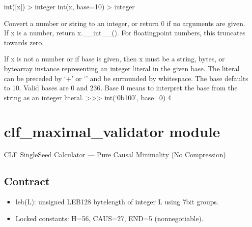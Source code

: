 \documentclass[letterpaper,10pt,english]{sphinxmanual}
\begin{document}

\begin{fulllineitems}
\label{\detokenize{clf_calculator:clf_calculator.END}}
\pysigstartsignatures
\pysigline
{}
\pysigstopsignatures
\sphinxAtStartPar
int({[}x{]}) \sphinxhyphen{}\textgreater{} integer
int(x, base=10) \sphinxhyphen{}\textgreater{} integer

\sphinxAtStartPar
Convert a number or string to an integer, or return 0 if no arguments
are given.  If x is a number, return x.\_\_int\_\_().  For floating\sphinxhyphen{}point
numbers, this truncates towards zero.

\sphinxAtStartPar
If x is not a number or if base is given, then x must be a string,
bytes, or bytearray instance representing an integer literal in the
given base.  The literal can be preceded by ‘+’ or ‘\sphinxhyphen{}’ and be surrounded
by whitespace.  The base defaults to 10.  Valid bases are 0 and 2\sphinxhyphen{}36.
Base 0 means to interpret the base from the string as an integer literal.
\textgreater{}\textgreater{}\textgreater{} int(‘0b100’, base=0)
4

\end{fulllineitems}


\sphinxstepscope


\section{clf\_maximal\_validator module}
\label{\detokenize{clf_maximal_validator:module-CLF_MAXIMAL_VALIDATOR_FINAL}}\label{\detokenize{clf_maximal_validator:clf-maximal-validator-module}}\label{\detokenize{clf_maximal_validator::doc}}
\sphinxAtStartPar
CLF Single\sphinxhyphen{}Seed Calculator — Pure Causal Minimality (No Compression)


\subsection{Contract}
\label{\detokenize{clf_maximal_validator:contract}}\begin{description}
\begin{itemize}
\item {} 
\sphinxAtStartPar
leb(L): unsigned LEB128 byte\sphinxhyphen{}length of integer L using 7\sphinxhyphen{}bit groups.

\item {} 
\sphinxAtStartPar
Locked constants: H=56, CAUS=27, END=5 (non\sphinxhyphen{}negotiable).

\end{itemize}

\end{description}
\end{document}
